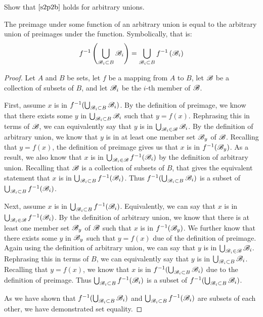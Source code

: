 \documentclass[main.tex]{subfiles}
\begin{document}
\subproblem{}\label{s2p3a}

Show that \(\ref{s2p2b}\) holds for arbitrary unions.

\begin{thm}
	The preimage under some function of an arbitrary union is equal to the
	arbitrary union of preimages under the function. Symbolically, that is:
	\[{f}^{-1}\left(\bigcup\limits_{\mathscr{B}_i \subset B} {\mathscr{B}_i}\right) = \bigcup\limits_{\mathscr{B}_i \subset B} {{f}^{-1}\left(\mathscr{B}_i\right)}\]
\end{thm}
\begin{proof}
	Let \(A\) and \(B\) be sets, let \(f\) be a mapping from \(A\) to \(B\),
	let \(\mathscr{B}\) be a collection of subsets of \(B\), and let
	\(\mathscr{B}_i\) be the \(i\)-th member of \(\mathscr{B}\).

	First, assume \(x\) is in
	\({f}^{-1}(\bigcup_{\mathscr{B}_i \subset B} {\mathscr{B}_i})\).
	By the definition of preimage, we know that there exists some \(y\) in
	\(\bigcup_{\mathscr{B}_i \subset B} {\mathscr{B}_i}\) such that
	\(y = f(x)\). Rephrasing this in terms of \(\mathscr{B}\), we can
	equivalently say that \(y\) is in
	\(\bigcup_{\mathscr{B}_i \in \mathscr{B}} {\mathscr{B}_i}\).
	By the definition of arbitrary union, we know
	that \(y\) is in at least one member set \(\mathscr{B}_y\) of
	\(\mathscr{B}\). Recalling that \(y = f(x)\), the definition of preimage
	gives us that \(x\) is in \({f}^{-1}(\mathscr{B}_y)\). As a result,
	we also know that \(x\) is in
	\(\bigcup_{\mathscr{B}_i \in \mathscr{B}} {{f}^{-1}(\mathscr{B}_i)}\)
	by the definition of arbitrary union. Recalling that \(\mathscr{B}\) is
	a collection of subsets of \(B\), that gives the equivalent statement
	that \(x\) is in
	\(\bigcup_{\mathscr{B}_i \subset B} {{f}^{-1}(\mathscr{B}_i)}\).
	Thus
	\({f}^{-1}(\bigcup_{\mathscr{B}_i \subset B} {\mathscr{B}_i})\)
	is a subset of
	\(\bigcup_{\mathscr{B}_i \subset B} {{f}^{-1}(\mathscr{B}_i)}\).

	Next, assume \(x\) is in
	\(\bigcup_{\mathscr{B}_i \subset B} {{f}^{-1}(\mathscr{B}_i)}\).
	Equivalently, we can say that \(x\) is in
	\(\bigcup_{\mathscr{B}_i \in \mathscr{B}} {{f}^{-1}(\mathscr{B}_i)}\).
	By the definition of arbitrary union, we know that there is at least one
	member set \(\mathscr{B}_y\) of \(\mathscr{B}\) such that \(x\) is in
	\({f}^{-1}(\mathscr{B}_y)\). We further know that there exists some
	\(y\) in \(\mathscr{B}_y\) such that \(y = f(x)\) due of the definition
	of preimage. Again using the definition of arbitrary union, we can say
	that \(y\) is in
	\(\bigcup_{\mathscr{B}_i \in \mathscr{B}} {\mathscr{B}_i}\).
	Rephrasing this in terms of \(B\), we can equivalently say that \(y\) is
	in \(\bigcup_{\mathscr{B}_i \subset B} {\mathscr{B}_i}\).
	Recalling that \(y = f(x)\), we know that \(x\) is in
	\({f}^{-1}(\bigcup_{\mathscr{B}_i \subset B} {\mathscr{B}_i})\)
	due to the definition of preimage. Thus
	\(\bigcup_{\mathscr{B}_i \subset B} {{f}^{-1}(\mathscr{B}_i)}\)
	is a subset of
	\({f}^{-1}(\bigcup_{\mathscr{B}_i \subset B} {\mathscr{B}_i})\).

	As we have shown that
	\({f}^{-1}(\bigcup_{\mathscr{B}_i \subset B} {\mathscr{B}_i})\)
	and
	\(\bigcup_{\mathscr{B}_i \subset B} {{f}^{-1}(\mathscr{B}_i)}\)
	are subsets of each other, we have demonstrated set equality.
\end{proof}
\end{document}
